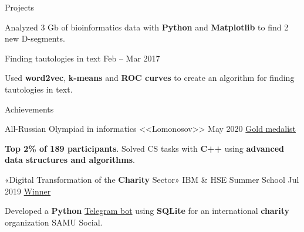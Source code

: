 \documentclass{resume}
\begin{document}
\begin{rSection}{Projects}
\begin{rSubsection}
    \item Analyzed 3 Gb of bioinformatics data with \textbf{Python} and \textbf{Matplotlib} to find 2 new D-segments.
    \end{rSubsection}

    \begin{rSubsection}
        {Finding tautologies in text}
            {Feb -- Mar 2017}{}{}

    \item Used \textbf{word2vec}, \textbf{k-means} and \textbf{ROC curves} to create an algorithm for finding tautologies in text.
    \end{rSubsection}
\end{rSection}

\begin{rSection}{Achievements}
    \begin{rSubsection}
        {All-Russian Olympiad in informatics <<Lomonosov>>}
            {May 2020}
        {\href{https://drive.google.com/file/d/1IZ79oAVpzXzu7v7-jUK-btdeVrDk8Che/view?usp=sharing}{Gold medalist}}{}

    \item \textbf{Top 2\% of 189 participants}. Solved CS tasks with \textbf{C++} using \textbf{advanced data structures and algorithms}.
    \end{rSubsection}

    \begin{rSubsection}
        {«Digital Transformation of the \textbf{Charity} Sector» IBM \& HSE Summer School}
            {Jul 2019}
        {\href{https://www.hse.ru/en/news/298686356.html}{Winner}}{}

    \item Developed a \textbf{Python} \href{https://github.com/SenchoPens/samumoskva_bot}{Telegram bot}
      using \textbf{SQLite} for an international \textbf{charity} organization SAMU Social.
    \end{rSubsection}
\end{rSection}
\end{document}
